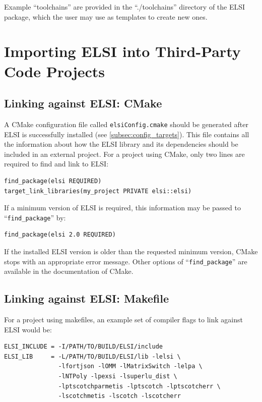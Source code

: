 \documentclass{report}
\begin{document}
Example ``toolchains'' are provided in the ``./toolchains'' directory of the ELSI package, which the user may use as templates to create new ones.

\section{Importing ELSI into Third-Party Code Projects}
\label{sec:import}
\subsection{Linking against ELSI:  CMake}
\label{subsec:import_cmake}
A CMake configuration file called \texttt{elsiConfig.cmake} should be generated after ELSI is successfully installed (see \ref{subsec:config_targets}).  This file contains all the information about how the ELSI library and its dependencies should be included in an external project.  For a project using CMake, only two lines are required to find and link to ELSI:
\begin{tcolorbox}
\begin{verbatim}
find_package(elsi REQUIRED)
target_link_libraries(my_project PRIVATE elsi::elsi)
\end{verbatim}
\end{tcolorbox}

If a minimum version of ELSI is required, this information may be passed to ``\verb+find_package+'' by:
\begin{tcolorbox}
\begin{verbatim}
find_package(elsi 2.0 REQUIRED)
\end{verbatim}
\end{tcolorbox}

If the installed ELSI version is older than the requested minimum version, CMake stops with an appropriate error message.  Other options of ``\verb+find_package+'' are available in the documentation of CMake.

\subsection{Linking against ELSI:  Makefile}
\label{subsec:import_makefile}
For a project using makefiles, an example set of compiler flags to link against ELSI would be:
\begin{tcolorbox}
\begin{verbatim}
ELSI_INCLUDE = -I/PATH/TO/BUILD/ELSI/include
ELSI_LIB     = -L/PATH/TO/BUILD/ELSI/lib -lelsi \
               -lfortjson -lOMM -lMatrixSwitch -lelpa \
               -lNTPoly -lpexsi -lsuperlu_dist \
               -lptscotchparmetis -lptscotch -lptscotcherr \
               -lscotchmetis -lscotch -lscotcherr
\end{verbatim}
\end{tcolorbox}
\end{document}
